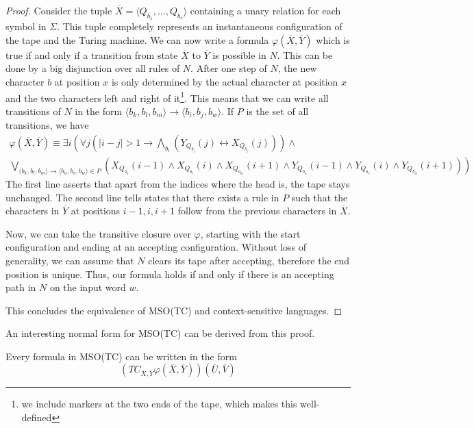 \begin{proof}
    Consider the tuple $\overline{X} = \langle Q_{b_1}, \dots, Q_{b_r} \rangle$ containing a unary relation for each symbol in $\Sigma$.
    This tuple completely represents an instantaneous configuration of the tape and the Turing machine.
    We can now write a formula $\varphi(\overline{X}, \overline{Y})$ which is true if and only if a transition from state $\overline{X}$ to $\overline{Y}$ is possible in $N$.
    This can be done by a big disjunction over all rules of $N$.
    After one step of $N$, the new character $b$ at position $x$ is only determined by the actual character at position $x$ and the two characters left and right of it\footnote{we include markers at the two ends of the tape, which makes this well-defined}.
    This means that we can write all transitions of $N$ in the form $\langle b_{k},b_{l},b_{m}\rangle \to \langle b_{i}, b_{j}, b_{w} \rangle$.
    If $P$ is the set of all transitions, we have
    \begin{multline*}
        \varphi(\overline{X}, \overline{Y}) \equiv \exists i \left(\forall j \left(|i - j| > 1 \to \bigwedge_{b_i}\left(Y_{Q_{b_i}}(j) \leftrightarrow X_{Q_{b_i}}(j)\right)\right) \land \right. \\
        \left. \bigvee_{\langle b_{k},b_{l},b_{m}\rangle \to \langle b_{u}, b_{v}, b_{w} \rangle \in P} \left(X_{Q_{b_{k}}}(i - 1) \land X_{Q_{b_{l}}}(i) \land X_{Q_{b_{m}}}(i + 1) \land Y_{Q_{b_{u}}}(i - 1) \land Y_{Q_{b_{v}}}(i) \land Y_{Q_{b_{w}}}(i + 1) \right)\right)
    \end{multline*}
    The first line asserts that apart from the indices where the head is, the tape stays unchanged.
    The second line tells states that there exists a rule in $P$ such that the characters in $\overline{Y}$ at positions $i - 1, i, i + 1$ follow from the previous characters in $\overline{X}$.

    Now, we can take the transitive closure over $\varphi$, starting with the start configuration and ending at an accepting configuration.
    Without loss of generality, we can assume that $N$ clears its tape after accepting, therefore the end position is unique.
    Thus, our formula holds if and only if there is an accepting path in $N$ on the input word $w$.

    This concludes the equivalence of MSO(TC) and context-sensitive languages.
\end{proof}

An interesting normal form for MSO(TC) can be derived from this proof.
\begin{corollary}
    \label{cor:normalmso}
    Every formula in MSO(TC) can be written in the form
    \[
        \left( TC_{\overline{X}, \overline{Y}} \varphi(\overline{X}, \overline{Y}) \right)\left( \overline{U}, \overline{V} \right)
    \]
\end{corollary}

